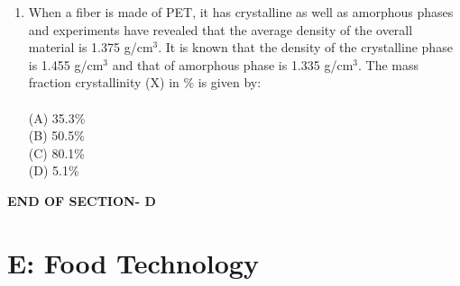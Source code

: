 \documentclass[journal,12pt,onecolumn]{IEEEtran}
\begin{document}
\begin{enumerate}[label=\arabic*)]
\item When a fiber is made of PET, it has crystalline as well as amorphous phases and experiments have revealed that the average density of the overall material is 1.375 g/cm$^3$. It is known that the density of the crystalline phase is 1.455 g/cm$^3$ and that of amorphous phase is 1.335 g/cm$^3$. The mass fraction crystallinity (X) in \% is given by:\\
\vspace{0.2cm}
\hfill{} \\
(A) 35.3\%\\
(B) 50.5\%\\
(C) 80.1\%\\
(D) 5.1\%
\vspace{0.5cm}
\end{enumerate}

\vspace{3\baselineskip}
    \begin{center}
    \textbf{\Large END OF SECTION- D}
    \end{center}

\newpage

\section*{E: Food Technology}
\vspace{1cm}
\end{document}
